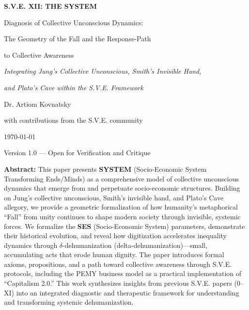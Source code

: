 \documentclass[11pt,a4paper]{article}
\newcommand{\SYSTEM}{\textbf{SYSTEM}}
\newcommand{\SES}{\textbf{SES}}
\newcommand{\deltaDehum}{$\delta$-dehumanization}
\theoremstyle{definition}
\theoremstyle{remark}
\begin{document}
\begin{titlepage}
    \centering
    \vspace*{1.5cm}
    
    {\Huge\bfseries S.V.E. XII: THE \SYSTEM{}\par}
    \vspace{0.5cm}
    {\Large Diagnosis of Collective Unconscious Dynamics:\par}
    {\Large The Geometry of the Fall and the Response-Path\par}
    {\Large to Collective Awareness\par}
    \vspace{1.5cm}
    
    {\large\textit{Integrating Jung's Collective Unconscious, Smith's Invisible Hand,}\par}
    {\large\textit{and Plato's Cave within the S.V.E. Framework}\par}
    \vspace{2cm}
    
    {\large Dr. Artiom Kovnatsky\par}
    {\normalsize with contributions from the S.V.E. community\par}
    \vspace{2cm}
    
    {\large\today\par}
    {\normalsize Version 1.0 — Open for Verification and Critique\par}
    \vspace{1cm}
    
    \vfill
    
    \begin{mdframed}[backgroundcolor=gray!5]
    \small
    \textbf{Abstract:} This paper presents \SYSTEM{} (Socio-Economic System Transforming Ends/Minds) as a comprehensive model of collective unconscious dynamics that emerge from and perpetuate socio-economic structures. Building on Jung's collective unconscious, Smith's invisible hand, and Plato's Cave allegory, we provide a geometric formalization of how humanity's metaphorical ``Fall'' from unity continues to shape modern society through invisible, systemic forces. We formalize the \SES{} (Socio-Economic System) parameters, demonstrate their historical evolution, and reveal how digitization accelerates inequality dynamics through \deltaDehum{} (delta-dehumanization)---small, accumulating acts that erode human dignity. The paper introduces formal axioms, propositions, and a path toward collective awareness through S.V.E. protocols, including the PEMY business model as a practical implementation of ``Capitalism 2.0.'' This work synthesizes insights from previous S.V.E. papers (0--XI) into an integrated diagnostic and therapeutic framework for understanding and transforming systemic dehumanization.
    \end{mdframed}
    
\end{titlepage}
\end{document}
